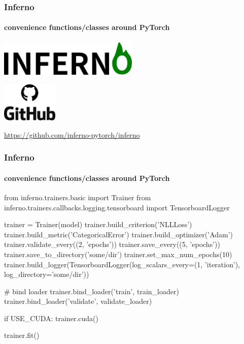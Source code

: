 \documentclass{beamer}
\begin{document}
\begin{frame}
\frametitle{Inferno}
\framesubtitle{convenience functions/classes around PyTorch}

\begin{center}
\includegraphics[width=0.5\textwidth]{inferno.pdf}
\end{center}
\vspace{1cm}
\begin{center}
\includegraphics[width=0.2\textwidth]{g.pdf}
\end{center}
\begin{center}
\url{https://github.com/inferno-pytorch/inferno}
\end{center}
\end{frame}


\begin{frame}[fragile ]
\frametitle{Inferno}
\framesubtitle{convenience functions/classes around PyTorch}

\begin{pythoncode}
from inferno.trainers.basic import Trainer
from inferno.trainers.callbacks.logging.tensorboard import TensorboardLogger

trainer = Trainer(model)
trainer.build_criterion('NLLLoss')
trainer.build_metric('CategoricalError')
trainer.build_optimizer('Adam')
trainer.validate_every((2, 'epochs'))
trainer.save_every((5, 'epochs'))
trainer.save_to_directory('some/dir')
trainer.set_max_num_epochs(10)
trainer.build_logger(TensorboardLogger(log_scalars_every=(1, 'iteration'),
                log_directory='some/dir'))

# bind loader 
trainer.bind_loader('train', train_loader) 
trainer.bind_loader('validate', validate_loader)

if USE_CUDA:
  trainer.cuda()

trainer.fit()
\end{pythoncode}
\end{frame}
\end{document}
